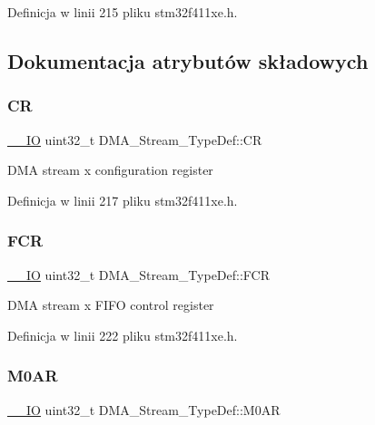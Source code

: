 Definicja w linii 215 pliku stm32f411xe.\+h.



\subsection{Dokumentacja atrybutów składowych}
\mbox{\label{struct_d_m_a___stream___type_def_af893adc5e821b15d813237b2bfe4378b}} 
\subsubsection{\texorpdfstring{CR}{CR}}
{\footnotesize\ttfamily \hyperlink{core__sc300_8h_aec43007d9998a0a0e01faede4133d6be}{\+\_\+\+\_\+\+IO} uint32\+\_\+t D\+M\+A\+\_\+\+Stream\+\_\+\+Type\+Def\+::\+CR}

D\+MA stream x configuration register 

Definicja w linii 217 pliku stm32f411xe.\+h.

\mbox{\label{struct_d_m_a___stream___type_def_aad3d78ab35e7af48951be5be53392f9f}} 
\subsubsection{\texorpdfstring{F\+CR}{FCR}}
{\footnotesize\ttfamily \hyperlink{core__sc300_8h_aec43007d9998a0a0e01faede4133d6be}{\+\_\+\+\_\+\+IO} uint32\+\_\+t D\+M\+A\+\_\+\+Stream\+\_\+\+Type\+Def\+::\+F\+CR}

D\+MA stream x F\+I\+FO control register 

Definicja w linii 222 pliku stm32f411xe.\+h.

\mbox{\label{struct_d_m_a___stream___type_def_a965da718db7d0303bff185d367d96fd6}} 
\subsubsection{\texorpdfstring{M0\+AR}{M0AR}}
{\footnotesize\ttfamily \hyperlink{core__sc300_8h_aec43007d9998a0a0e01faede4133d6be}{\+\_\+\+\_\+\+IO} uint32\+\_\+t D\+M\+A\+\_\+\+Stream\+\_\+\+Type\+Def\+::\+M0\+AR}


